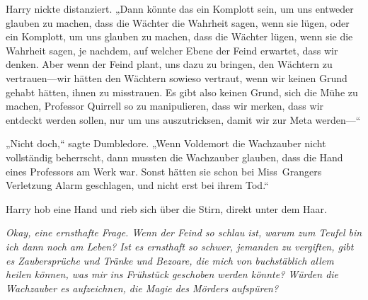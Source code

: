 Harry nickte distanziert.
„Dann könnte das ein Komplott sein, um uns entweder glauben zu machen, dass die Wächter die Wahrheit sagen, wenn sie lügen, oder ein Komplott, um uns glauben zu machen, dass die Wächter lügen, wenn sie die Wahrheit sagen, je nachdem, auf welcher Ebene der Feind erwartet, dass wir denken. Aber wenn der Feind plant, uns dazu zu bringen, den Wächtern zu vertrauen—wir hätten den Wächtern sowieso vertraut, wenn wir keinen Grund gehabt hätten, ihnen zu misstrauen. Es gibt also keinen Grund, sich die Mühe zu machen, Professor Quirrell so zu manipulieren, dass wir merken, dass wir entdeckt werden sollen, nur um uns auszutricksen, damit wir zur Meta werden—“

„Nicht doch,“ sagte Dumbledore. „Wenn Voldemort die Wachzauber nicht vollständig beherrscht, dann mussten die Wachzauber glauben, dass die Hand eines Professors am Werk war. Sonst hätten sie schon bei Miss~Grangers Verletzung Alarm geschlagen, und nicht erst bei ihrem Tod.“

Harry hob eine Hand und rieb sich über die Stirn, direkt unter dem Haar.

\emph{Okay, eine ernsthafte Frage. Wenn der Feind so schlau ist, warum zum Teufel bin ich dann noch am Leben? Ist es ernsthaft so schwer, jemanden zu vergiften, gibt es Zaubersprüche und Tränke und Bezoare, die mich von buchstäblich allem heilen können, was mir ins Frühstück geschoben werden könnte? Würden die Wachzauber es aufzeichnen, die Magie des Mörders aufspüren?}

